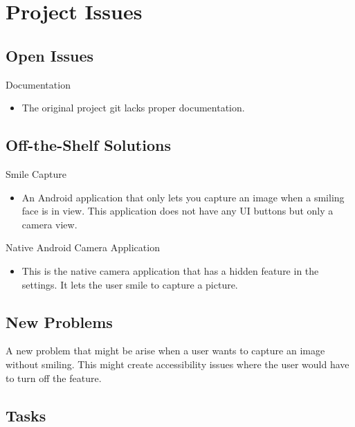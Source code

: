 \documentclass[12pt, titlepage]{article}
\begin{document}
\section{Project Issues}

\subsection{Open Issues}

Documentation
\begin{itemize}
\item The original project git lacks proper documentation.
\end{itemize}

\subsection{Off-the-Shelf Solutions}
 Smile Capture
\begin{itemize}
\item An Android application that only lets you capture an image when a smiling face is in view. This application does not have any UI buttons but only a camera view.
\end{itemize}

Native Android Camera Application
\begin{itemize}
\item This is the native camera application that has a hidden feature in the settings. It lets the user smile to capture a picture.

\end{itemize}

\subsection{New Problems}

A new problem that might be arise when a user wants to capture an image without smiling. This might create accessibility issues where the user would have to turn off the feature.

\subsection{Tasks}
\end{document}
